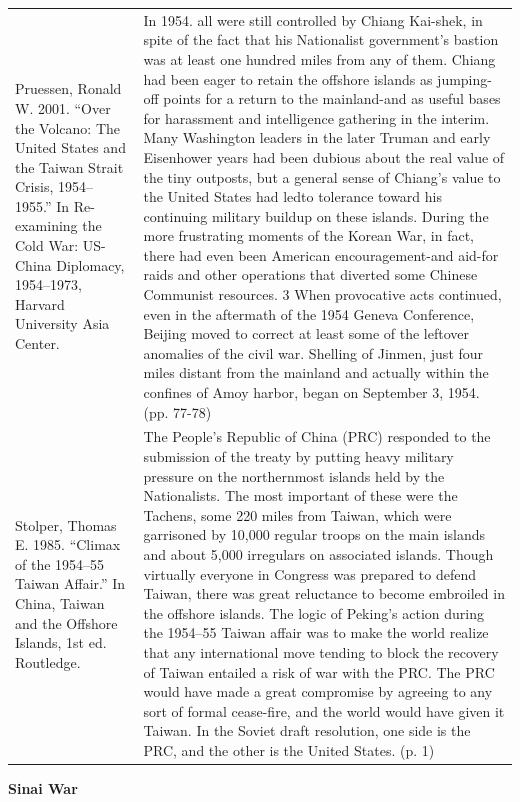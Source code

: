 {\begin{longtable}{p{}p{}}
\\
Pruessen, Ronald W. 2001. “Over the Volcano: The United States and the Taiwan Strait Crisis, 1954–1955.” In Re-examining the Cold War: US-China Diplomacy, 1954–1973, Harvard University Asia Center. & In 1954. all were still controlled by Chiang Kai-shek, in spite of the fact that his Nationalist government's bastion was at least one hundred miles from any of them. Chiang had been eager to retain the offshore islands as jumping-off points for a return to the mainland-and as useful bases for harassment and intelligence gathering in the interim. Many Washington leaders in the later Truman and early Eisenhower years had been dubious about the real value of the tiny outposts, but a general sense of Chiang's value to the United States had ledto tolerance toward his continuing military buildup on these islands. During the more frustrating moments of the Korean War, in fact, there had even been American encouragement-and aid-for raids and other operations that diverted some Chinese Communist resources. 3 When provocative acts continued, even in the aftermath of the 1954 Geneva Conference, Beijing moved to correct at least some of the leftover anomalies of the civil war. Shelling of Jinmen, just four miles distant from the mainland and actually within the confines of Amoy harbor, began on September 3, 1954. (pp. 77-78)
\\
Stolper, Thomas E. 1985. “Climax of the 1954–55 Taiwan Affair.” In China, Taiwan and the Offshore Islands, 1st ed. Routledge. & The People's Republic of China (PRC) responded to the submission of the treaty by putting heavy military pressure on the northernmost islands held by the Nationalists. The most important of these were the Tachens, some 220 miles from Taiwan, which were garrisoned by 10,000 regular troops on the main islands and about 5,000 irregulars on associated islands. Though virtually everyone in Congress was prepared to defend Taiwan, there was great reluctance to become embroiled in the offshore islands. The logic of Peking's action during the 1954–55 Taiwan affair was to make the world realize that any international move tending to block the recovery of Taiwan entailed a risk of war with the PRC. The PRC would have made a great compromise by agreeing to any sort of formal cease-fire, and the world would have given it Taiwan. In the Soviet draft resolution, one side is the PRC, and the other is the United States.  (p. 1)
\\
\end{longtable}}
\clearpage
         \textbf{Sinai War} 

